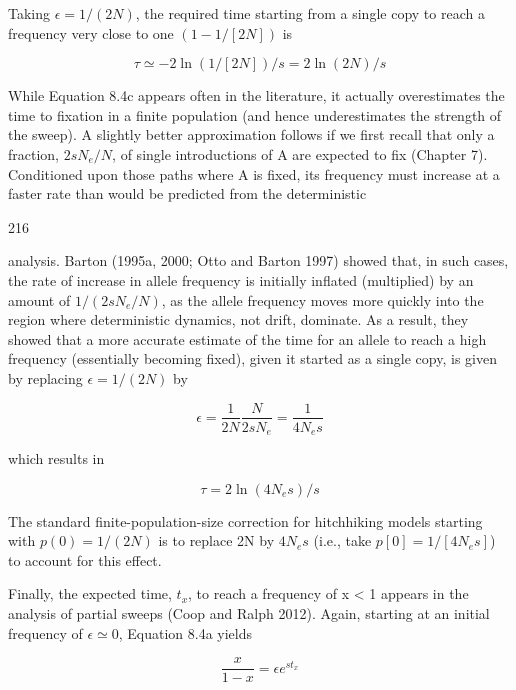 \documentclass{article}
\begin{document}
Taking  $ \epsilon = 1/(2N) $, the required time starting from a single copy to reach a frequency very close to one  $ (1 - 1/[2N]) $ is

\begin{equation}
\tau\simeq-2\ln(1/[2N])/s=2\ln(2N)/s
\tag{8.4c}
\label{eq:8_4c}
\end{equation}

While Equation 8.4c appears often in the literature, it actually overestimates the time to fixation in a finite population (and hence underestimates the strength of the sweep). A slightly better approximation follows if we first recall that only a fraction,  $ 2sN_e/N $, of single introductions of A are expected to fix (Chapter 7). Conditioned upon those paths where A is fixed, its frequency must increase at a faster rate than would be predicted from the deterministic

216

analysis. Barton (1995a, 2000; Otto and Barton 1997) showed that, in such cases, the rate of increase in allele frequency is initially inflated (multiplied) by an amount of  $ 1/(2sN_e/N) $, as the allele frequency moves more quickly into the region where deterministic dynamics, not drift, dominate. As a result, they showed that a more accurate estimate of the time for an allele to reach a high frequency (essentially becoming fixed), given it started as a single copy, is given by replacing  $ \epsilon = 1/(2N) $ by

\begin{equation}
\epsilon=\frac{1}{2N}\frac{N}{2sN_{e}}=\frac{1}{4N_{e}s}
\end{equation}

which results in

\begin{equation}
\tau=2\ln(4N_{e}s)/s
\tag{8.4d}
\label{eq:8_4d}
\end{equation}

The standard finite-population-size correction for hitchhiking models starting with  $ p(0) = 1/(2N) $ is to replace 2N by  $ 4N_e s $ (i.e., take  $ p[0] = 1/[4N_e s] $) to account for this effect.

Finally, the expected time,  $ t_{x} $, to reach a frequency of x < 1 appears in the analysis of partial sweeps (Coop and Ralph 2012). Again, starting at an initial frequency of  $ \epsilon \simeq 0 $, Equation 8.4a yields

\begin{equation}
\frac{x}{1-x}=\epsilon e^{st_{x}}
\end{equation}
\end{document}
